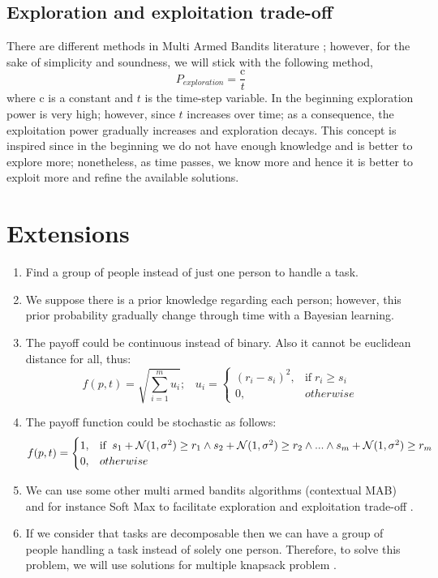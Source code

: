 \documentclass[]{article}
\begin{document}
\subsection{Exploration and exploitation trade-off}
There are different methods in Multi Armed Bandits literature \cite{auer2002finite, kuleshov2014algorithms}; however, for the sake of simplicity and soundness, we will stick with the following method,
\begin{equation}
	P_{exploration} = \frac{\text{c}}{t}
\end{equation}
where c is a constant and $t$ is the time-step variable. In the beginning exploration power is very high; however, since $t$ increases over time; as a consequence, the exploitation power gradually increases and exploration decays. This concept is inspired since in the beginning we do not have enough knowledge and is better to explore more; nonetheless, as time passes, we know more and hence it is better to exploit more and refine the available solutions.

\section{Extensions}
\begin{enumerate}
	\item Find a group of people instead of just one person to handle a task.
	\item We suppose there is a prior knowledge regarding each person; however, this prior probability gradually change through time with a Bayesian learning.
	\item The payoff could be continuous instead of binary. Also it cannot be euclidean distance for all, thus: 
	\begin{equation}
		f(p,t) = \sqrt{\sum_{i=1}^{m}u_i};\;\;\;
		u_i = 
		\begin{cases}
			(r_i - s_i)^2,	& \text{if}\; r_i \geq s_i\\
			0,	& otherwise
		\end{cases}
	\end{equation}
	\item The payoff function could be stochastic as follows:
	\begin{equation}
		f(p,t) = 
		\begin{cases}
			1,	& \text{if\;\;} s_1 + \mathcal{N}(1,\sigma^2) \geq r_1 \wedge s_2 + \mathcal{N}(1,\sigma^2) \geq r_2 \wedge ... \wedge s_m + \mathcal{N}(1,\sigma^2) \geq r_m\\
			0,	& otherwise
		\end{cases}
	\end{equation}
	\item We can use some other multi armed bandits algorithms (contextual MAB) and for instance Soft Max to facilitate exploration and exploitation trade-off \cite{li2010contextual, kuleshov2014algorithms}.
	\item If we consider that tasks are decomposable then we can have a group of people handling a task instead of solely one person. Therefore, to solve this problem, we will use solutions for multiple knapsack problem \cite{chekuri2005polynomial}.
\end{enumerate}



\end{document}
